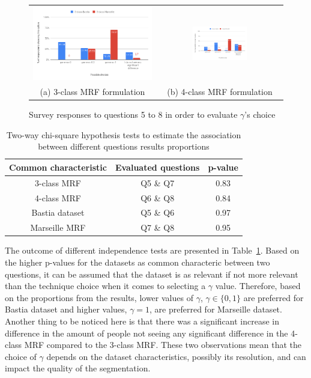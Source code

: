 \documentclass{kththesis}
\begin{document}
\begin{figure}[H]
\begin{tabular}{c c}
\includegraphics[width=0.45 \textwidth]{images/Results/MRF_survey/3-class.png}  & \includegraphics[width=0.45\textwidth]{images/Results/MRF_survey/4-class.png} \\
(a) 3-class MRF formulation & (b) 4-class MRF formulation
\end{tabular}
\caption{Survey responses to questions 5 to 8 in order to evaluate $\gamma$'s choice }
\label{fig:survey_gamma}
\end{figure}

\begin{table}[H]
\begin{tabular}{|c|c|c|}
\hline
Common characteristic & Evaluated questions & p-value \\
\hline
3-class MRF & Q5 \& Q7 & 0.83 \\ 
\hline
4-class MRF & Q6 \& Q8 & 0.84 \\
\hline
Bastia dataset & Q5 \& Q6 & 0.97 \\
\hline
Marseille MRF & Q7 \& Q8 & 0.95 \\
\hline
\end{tabular}
\caption{Two-way chi-square hypothesis tests to estimate the association between different questions results proportions}
\label{tab:hyp_test_gamma}
\end{table}

The outcome of different independence tests are presented in Table~\ref{tab:hyp_test_gamma}. Based on the higher p-values for the datasets as common characteric between two questions, it can be assumed that the dataset is as relevant if not more relevant than the technique choice when it comes to selecting a $\gamma$ value. Therefore, based on the proportions from the results, lower values of $\gamma$, $\gamma \in \{0,1\}$ are preferred for Bastia dataset and higher values, $\gamma = 1$, are preferred for Marseille dataset. Another thing to be noticed here is that there was a significant increase in difference in the amount of people not seeing any significant difference in the 4-class MRF compared to the 3-class MRF. These two observations mean that the choice of $\gamma$ depends on the dataset characteristics, possibly its resolution, and can impact the quality of the segmentation. 
\end{document}
